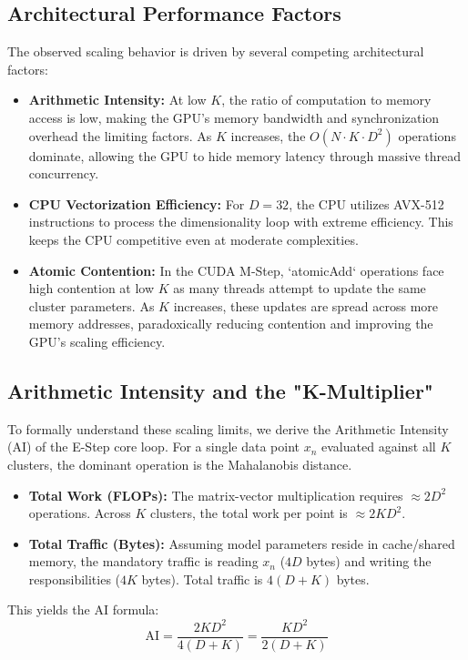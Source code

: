 \documentclass[10pt]{article}
\begin{document}
\subsection{Architectural Performance Factors}
The observed scaling behavior is driven by several competing architectural factors:
\begin{itemize}
    \item \textbf{Arithmetic Intensity:} At low $K$, the ratio of computation to memory access is low, making the GPU's memory bandwidth and synchronization overhead the limiting factors. As $K$ increases, the $O(N \cdot K \cdot D^2)$ operations dominate, allowing the GPU to hide memory latency through massive thread concurrency.
    \item \textbf{CPU Vectorization Efficiency:} For $D=32$, the CPU utilizes AVX-512 instructions to process the dimensionality loop with extreme efficiency. This keeps the CPU competitive even at moderate complexities.
    \item \textbf{Atomic Contention:} In the CUDA M-Step, `atomicAdd` operations face high contention at low $K$ as many threads attempt to update the same cluster parameters. As $K$ increases, these updates are spread across more memory addresses, paradoxically reducing contention and improving the GPU's scaling efficiency.
\end{itemize}

\subsection{Arithmetic Intensity and the "K-Multiplier"}
To formally understand these scaling limits, we derive the Arithmetic Intensity (AI) of the E-Step core loop. For a single data point $x_n$ evaluated against all $K$ clusters, the dominant operation is the Mahalanobis distance.
\begin{itemize}
    \item \textbf{Total Work (FLOPs):} The matrix-vector multiplication requires $\approx 2D^2$ operations. Across $K$ clusters, the total work per point is $\approx 2KD^2$.
    \item \textbf{Total Traffic (Bytes):} Assuming model parameters reside in cache/shared memory, the mandatory traffic is reading $x_n$ ($4D$ bytes) and writing the responsibilities ($4K$ bytes). Total traffic is $4(D+K)$ bytes.
\end{itemize}

This yields the AI formula:
\begin{equation}
\text{AI} = \frac{2 K D^2}{4(D + K)} = \frac{K D^2}{2(D + K)}
\end{equation}
\end{document}
